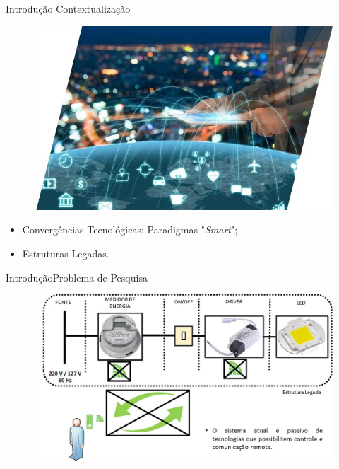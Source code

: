 \begin{frame}{Introdução}
{Contextualização}

 \begin{figure}[htp]
	\centering
	\caption{ }
    \includegraphics[width=0.5\linewidth]{img/fidi.jpg}
    \hspace{5cm}
\end{figure}
 
\begin{itemize}
\item Convergências Tecnológicas: Paradigmas "\textit{Smart}";
\item Estruturas Legadas.
 \end{itemize}
\end{frame}

\begin{frame}{Introdução}{Problema de Pesquisa}
	\vspace{-0.64cm}
	\begin{figure}[htp]
		\centering
		\caption{}
		\includegraphics[width=0.97\linewidth]{img/1.jpg}
	    \hspace{5cm}
	    \vspace{5cm}
	\end{figure}

\end{frame}

